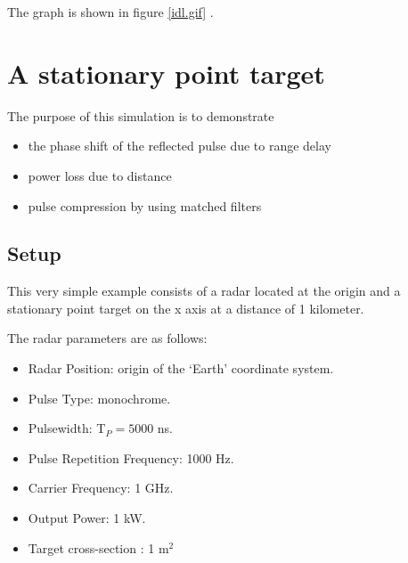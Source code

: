\documentclass[thmsa,a4paper,ukenglish]{report}
\begin{document}
The graph is shown in figure \ref{idl.gif} .


\section{\protect\smallskip A stationary point target}

The purpose of this simulation is to demonstrate

\begin{itemize}
\item  the phase shift of the reflected pulse due to range delay

\item  power loss due to distance

\item  pulse compression by using matched filters
\end{itemize}

\subsection{Setup}

\smallskip This very simple example consists of a radar located at the
origin and a stationary point target on the x axis at a distance of 1
kilometer.

\smallskip The radar parameters are as follows:

\begin{itemize}
\item  \smallskip Radar Position: origin of the `Earth' coordinate system.

\item  \smallskip Pulse Type: monochrome.

\item  \smallskip Pulsewidth: T$_{P}=5000$ ns.

\item  \smallskip Pulse Repetition Frequency: 1000 Hz.

\item  \smallskip Carrier Frequency: 1 GHz.

\item  \smallskip Output Power: 1 kW.

\item  Target cross-section : 1 m$^{2}$
\end{itemize}
\end{document}
